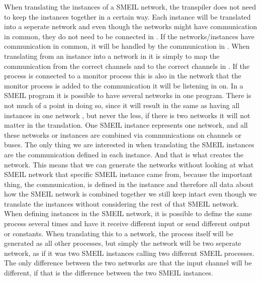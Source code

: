 When translating the instances of a SMEIL network, the transpiler does not need to keep the instances together in a certain way. Each instance will be translated into a seperate \cspm network and even though the networks might have communication in common, they do not need to be connected in \cspm. If the networks/instances have communication in common, it will be handled by the communication in \cspm. When translating from an instance into a network in \cspm it is simply to map the communication from the correct channels and to the correct channels in \cspm. If the process is connected to a monitor process this is also in the network that the monitor process is added to the communication it will be listening in on.
In a SMEIL program it is possible to have several networks in one program. There is not much of a point in doing so, since it will result in the same as having all instances in one network %
, but never the less, if there is two networks it will not matter in the \cspm translation. One SMEIL instance represents one \cspm network, and all these networks or instances are combined via communications on channels or buses. The only thing we are interested in when translating the SMEIL instances are the communication defined in each instance. And that is what creates the network. This means that we can generate the \cspm networks without looking at what SMEIL network that specific SMEIL instance came from, because the important thing, the communication, is defined in the instance and therefore all data about how the SMEIL network is combined together we still keep intact even though we translate the instances without considering the rest of that SMEIL network.
When defining instances in the SMEIL network, it is possible to define the same process several times and have it receive different input or send different output or constants. When translating this to a \cspm network, the process itself will be generated as all other processes, but simply the network will be two seperate network, as if it was two SMEIL instances calling two different SMEIL processes. The only difference between the two networks are that the input channel will be different, if that is the difference between the two SMEIL instances.



